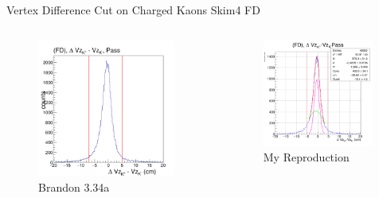 \documentclass[aspectratio=169]{beamer}
\begin{document}
\begin{frame}{Vertex Difference Cut on Charged Kaons \hfill Skim4 FD}
\vspace*{-0.6cm}
    \begin{columns}
    \begin{figure}
        \centering
        \includegraphics[width=0.94\textwidth]{brandon_figs/34a.png}
        \caption{Brandon 3.34a}
    \end{figure}
    \begin{figure}
        \centering
        \includegraphics[width=0.97\textwidth]{pdfs/34a.png}
        \caption{My Reproduction}
    \end{figure}
    \end{columns}
\end{frame}
\end{document}
